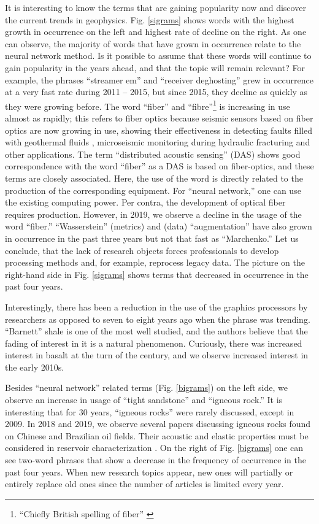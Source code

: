 \documentclass[geosciences,article,submit,moreauthors,pdftex]{Definitions/mdpi}
\begin{document}
It is interesting to know the terms that are gaining popularity now and discover the current trends in geophysics. Fig. \ref{sigrams} shows words with the highest growth in occurrence on the left and highest rate of decline on the right. As one can observe, the majority of words that have grown in occurrence relate to the neural network method. Is it possible to assume that these words will continue to gain popularity in the years ahead, and that the topic will remain relevant? For example, the phrases ``streamer em'' and ``receiver deghosting'' grew in occurrence at a very fast rate during 2011 – 2015, but since 2015, they decline as quickly as they were growing before. The word ``fiber'' and ``fibre''\footnote{``Chiefly British spelling of fiber'' \citep{MW2020}} is increasing in use almost as rapidly; this refers to fiber optics because seismic sensors based on fiber optics are now growing in use, showing their effectiveness in detecting faults filled with geothermal fluids \citep{Trainor-Guitton2018}, microseismic monitoring during hydraulic fracturing \citep{Binder2019} and other applications. The term “distributed acoustic sensing” (DAS) shows good correspondence with the word “fiber” as a DAS is based on fiber-optics, and these terms are closely associated. Here, the use of the word is directly related to the production of the corresponding equipment. For ``neural network,'' one can use the existing computing power. Per contra, the development of optical fiber requires production. However, in 2019, we observe a decline in the usage of the word ``fiber.'' ``Wasserstein'' (metrics) and (data) ``augmentation'' have also grown in occurrence in the past three years but not that fast as ``Marchenko.'' Let us conclude, that the lack of research objects forces professionals to develop processing methods and, for example, reprocess legacy data. The picture on the right-hand side in Fig. \ref{sigrams} shows terms that decreased in occurrence in the past four years.

Interestingly, there has been a reduction in the use of the graphics processors by researchers as opposed to seven to eight years ago when the phrase was trending. ``Barnett'' shale is one of the most well studied, and the authors believe that the fading of interest in it is a natural phenomenon. Curiously, there was increased interest in basalt at the turn of the century, and we observe increased interest in the early 2010s.


Besides ``neural network'' related terms (Fig. \ref{bigrams}) on the left side, we observe an increase in usage of ``tight sandstone'' and ``igneous rock.'' It is interesting that for 30 years, ``igneous rocks'' were rarely discussed, except in 2009. In 2018 and 2019, we observe several papers discussing igneous rocks found on Chinese and Brazilian oil fields. Their acoustic and elastic properties must be considered in reservoir characterization \citep{Penna2019}. On the right of Fig. \ref{bigrams} one can see two-word phrases that show a decrease in the frequency of occurrence in the past four years. When new research topics appear, new ones will partially or entirely replace old ones since the number of articles is limited every year. 
\end{document}
